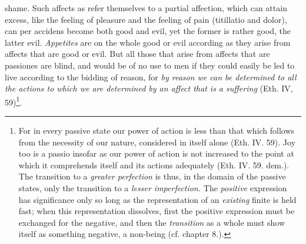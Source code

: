 \documentclass[12pt,a4paper,openany]{book}
\begin{document}
shame. Such affects as refer themselves to a partial
affection, which can attain excess, like the feeling of pleasure and the feeling of
pain (titillatio and dolor), can per accidens become both
good and evil, yet the former is rather good, the latter evil. \emph{Appetites}
are on the whole good or evil according as they
arise from affects that are good or evil. But all those
that arise from affects that are passiones are blind, and
would be of no use to men if they
could easily be led to live according to the bidding of reason, for
\emph{by reason we can be determined to all the
actions to which we are determined by an affect
that is a suffering} (Eth. IV, 59)\footnote{For in every passive state our power of action is less than that
which follows from the necessity of our nature, considered in itself alone
(Eth. IV. 59). Joy too is a passio insofar as our power of action
is not increased to the point at which it comprehends itself and its actions
adequately (Eth. IV. 59. dem.). The transition to a \emph{greater
perfection} is thus, in the domain of the passive states, only
the transition to a \emph{lesser imperfection.} The \emph{positive}
expression has significance only so long as the representation of an \emph{existing}
finite is held fast; when this representation dissolves, first
the positive expression must be exchanged for the negative, and then the \emph{transition} as a whole must show itself as something negative, a non-being (cf.
chapter 8.).}.
\end{document}
